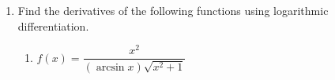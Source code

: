 \documentclass{article}
\begin{document}
\begin{enumerate}






\newpage 

\item Find the derivatives of the following functions using logarithmic differentiation.
\begin{enumerate}

    \item $f(x)=\dfrac{x^2}{(\arcsin x) \sqrt{x^2+1}}$
    \pspace{\vfill}
    

\end{enumerate}
\end{enumerate}
\end{document}

